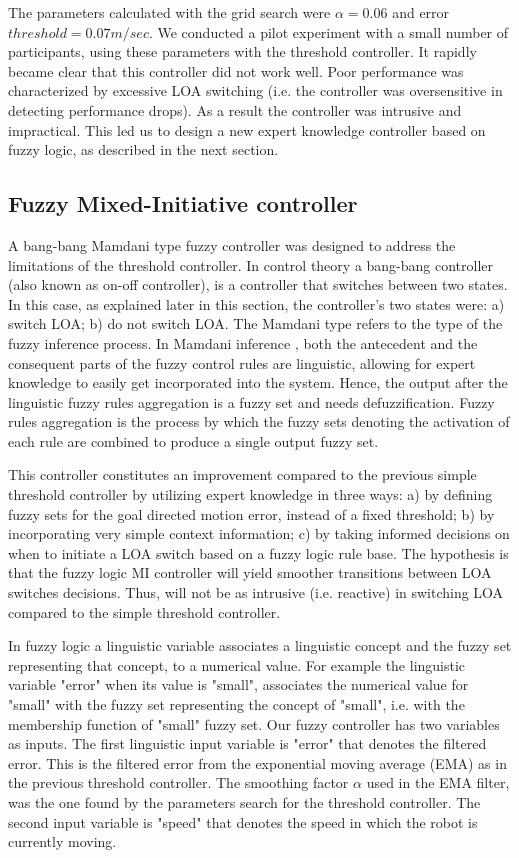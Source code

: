 \documentclass[a4paper,12pt,oneside,openright]{bhamthesis}
\begin{document}
The parameters calculated with the grid search were $\alpha = 0.06$ and error $threshold = 0.07 m/sec$. We conducted a pilot experiment with a small number of participants, using these parameters with the threshold controller. It rapidly became clear that this controller did not work well. Poor performance was characterized by excessive LOA switching (i.e. the controller was oversensitive in detecting performance drops). As a result the controller was intrusive and impractical. This led us to design a new expert knowledge controller based on fuzzy logic, as described in the next section.

\subsection{Fuzzy Mixed-Initiative controller}
\label{chapter5:fuzzy_controller}
A bang-bang Mamdani type fuzzy controller \citep{Mamdani1975,Nagi2009} was designed to address the limitations of the threshold controller. In control theory a bang-bang controller (also known as on-off controller), is a controller that switches between two states. In this case, as explained later in this section, the controller's two states were: a) switch LOA; b) do not switch LOA. The Mamdani type refers to the type of the fuzzy inference process. In Mamdani inference \citep{Mamdani1975}, both the antecedent and the consequent parts of the fuzzy control rules are linguistic, allowing for expert knowledge to easily get incorporated into the system. Hence, the output after the linguistic fuzzy rules aggregation is a fuzzy set and needs defuzzification. Fuzzy rules aggregation is the process by which the fuzzy sets denoting the activation of each rule are combined to produce a single output fuzzy set. 

This controller constitutes an improvement compared to the previous simple threshold controller by utilizing expert knowledge in three ways: a) by defining fuzzy sets for the goal directed motion error, instead of a fixed threshold; b) by incorporating very simple context information; c) by taking informed decisions on when to initiate a LOA switch based on a fuzzy logic rule base. The hypothesis is that the fuzzy logic MI controller will yield smoother transitions between LOA switches decisions. Thus, will not be as intrusive (i.e. reactive) in switching LOA compared to the simple threshold controller.

In fuzzy logic a linguistic variable associates a linguistic concept and the fuzzy set representing that concept, to a numerical value. For example the linguistic variable "error" when its value is "small", associates the numerical value for "small" with the fuzzy set representing the concept of "small", i.e. with the membership function of "small" fuzzy set. Our fuzzy controller has two variables as inputs. The first linguistic input variable is "error" that denotes the filtered error. This is the filtered error from the exponential moving average (EMA) as in the previous threshold controller. The smoothing factor $\alpha$ used in the EMA filter, was the one found by the parameters search for the threshold controller. The second input variable is "speed" that denotes the speed in which the robot is currently moving. 
\end{document}
